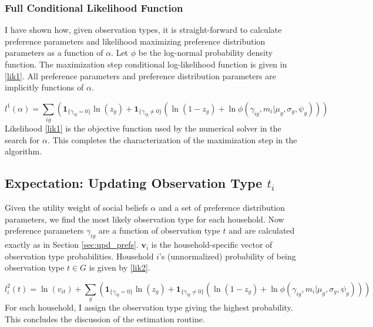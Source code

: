 \documentclass[11pt]{article}
\begin{document}
\begin{CJK}{UTF8}{gbsn}
\subsubsection{Full Conditional Likelihood Function}

I have shown how, given observation types, it is straight-forward to calculate preference parameters and likelihood maximizing preference distribution parameters as a function of $\alpha$.  Let $\phi$ be the log-normal probability density function.   The maximization step conditional log-likelihood function is given in \eqref{lik1}.  All preference parameters and preference distribution parameters are implicitly functions of $\alpha$.

\begin{equation}
	\label{lik1}
    l^1(\alpha) = \sum_{ig} \left(\mathbf{1}_{\{\gamma_{ig} = 0\}}\ln\left(z_g\right) + \mathbf{1}_{\{\gamma_{ig} \neq 0\}} \left(\ln\left(1 - z_g\right)+\ln \phi(\gamma_{ig},m_i|\mu_g,\sigma_g,\psi_g)\right)\right)
\end{equation}
Likelihood \eqref{lik1} is the objective function used by the numerical solver in the search for $\alpha$.  This completes the characterization of the maximization step in the algorithm.

\subsection{Expectation: Updating Observation Type $t_i$} 

Given the utility weight of social beliefs $\alpha$ and a set of preference distribution parameters, we find the most likely observation type for each household. Now preference parameters $\gamma_{ig}$ are a function of observation type $t$ and are calculated exactly as in Section \ref{sec:upd_prefs}. $\mathbf{v}_i$ is the household-specific vector of observation type probabilities.  Household $i$'s (unnormalized) probability of being observation type $t \in G$ is given by \eqref{lik2}.

\begin{equation}
    \label{lik2}
    l_i^2(t) = \ln(v_{it}) + \sum_{g} \left(\mathbf{1}_{\{\gamma_{ig} = 0\}}\ln\left(z_g\right) + \mathbf{1}_{\{\gamma_{ig} \neq 0\}} \left(\ln\left(1-z_g\right)+\ln \phi(\gamma_{ig}, m_i|\mu_g,\sigma_g,\psi_g)\right)\right)
\end{equation}
For each household, I assign the observation type giving the highest probability.  This concludes the discussion of the estimation routine.


\end{CJK}
\end{document}
